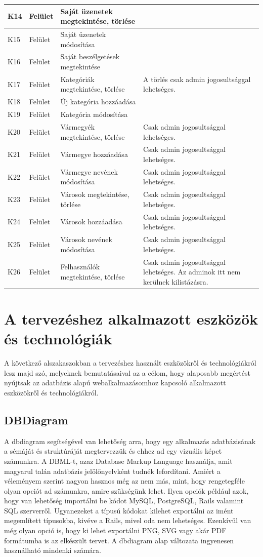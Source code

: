 \documentclass[]{thesis-ekf}
\theoremstyle{definition}
\theoremstyle{remark}
\begin{document}
\begin{longtable}{|l|l|p{3cm}|p{8cm}|}
			K14 & Felület & Saját üzenetek megtekintése, törlése & ~ \\ \hline
			K15 & Felület & Saját üzenetek módosítása & ~ \\ \hline
			K16 & Felület & Saját beszélgetések megtekintése & ~ \\ \hline
			K17 & Felület & Kategóriák megtekintése, törlése & A törlés csak admin jogosultsággal lehetséges. \\ \hline
			K18 & Felület & Új kategória hozzáadása & ~ \\ \hline
			K19 & Felület & Kategória módosítása & ~ \\ \hline
			K20 & Felület & Vármegyék megtekintése, törlése & Csak admin jogosultsággal lehetséges. \\ \hline
			K21 & Felület & Vármegye hozzáadása & Csak admin jogosultsággal lehetséges. \\ \hline
			K22 & Felület & Vármegye nevének módosítása & Csak admin jogosultsággal lehetséges. \\ \hline
			K23 & Felület & Városok megtekintése, törlése & Csak admin jogosultsággal lehetséges. \\ \hline
			K24 & Felület & Városok hozzáadása & Csak admin jogosultsággal lehetséges. \\ \hline
			K25 & Felület & Városok nevének módosítása & Csak admin jogosultsággal lehetséges. \\ \hline
			K26 & Felület & Felhasználók megtekintése, törlése & Csak admin jogosultsággal lehetséges. Az adminok itt nem kerülnek kilistázásra. \\ \hline
			
		\end{longtable}
		
	\section{A tervezéshez alkalmazott eszközök és technológiák}
		A következő alszakaszokban a tervezéshez használt eszközökről és technológiákról lesz majd szó, melyeknek bemutatásaival az a célom, hogy alaposabb megértést nyújtsak az adatbázis alapú webalkalmazásomhoz kapcsoló alkalmazott eszközökről és technológiákról.
	\subsection{DBDiagram}
	A dbdiagram segítségével van lehetőség arra, hogy egy alkalmazás adatbázisának a sémáját és struktúráját megtervezzük és ehhez ad egy vizuális képet számunkra. A DBML-t, azaz Database Markup Language használja, amit magyarul talán adatbázis jelölőnyelvként tudnék lefordítani. Amiért a véleményem szerint nagyon hasznos még az nem más, mint, hogy rengetegféle olyan opciót ad számunkra, amire szükségünk lehet. Ilyen opciók például azok, hogy van lehetőség importálni be kódot MySQL, PostgreSQL, Rails valamint SQL szerverről. Ugyanezeket a típusú kódokat kilehet exportálni az imént megemlített típusokba, kivéve a Rails, mivel oda nem lehetséges. Ezenkívül van még olyan opció is, hogy ki lehet exportálni PNG, SVG vagy akár PDF formátumba is az elkészült tervet. A dbdiagram alap változata ingyenesen használható mindenki számára. \cite{Dbdiagram}
	
\end{document}
